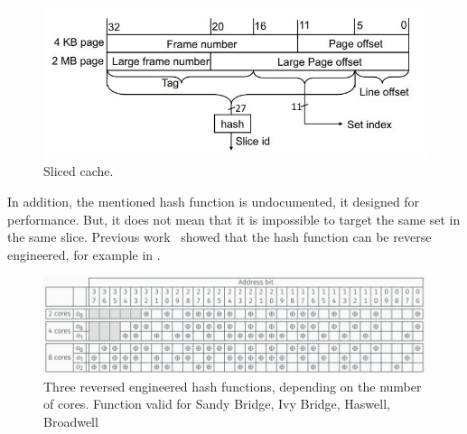 \begin{figure}[!ht]
    \centering
    \includegraphics[width=\textwidth]{images/chapter_6/slicedcache.JPG}
    \caption{Sliced cache.}
    \label{fig:slicedcache}
\end{figure}

In addition, the mentioned hash function is undocumented, it designed for performance. But, it does not mean that it is impossible to target the same set in the same slice. Previous work~\cite{EURECOM+4671} showed that the hash function can be reverse engineered, for example in .

\begin{figure}[!ht]
    \centering
    \includegraphics[width=\textwidth]{images/chapter_6/hashfunc.JPG}
    \caption{Three reversed engineered hash functions, depending on the number of cores. Function valid for Sandy Bridge, Ivy Bridge, Haswell, Broadwell}
    \label{fig:hashfunc}
\end{figure}

